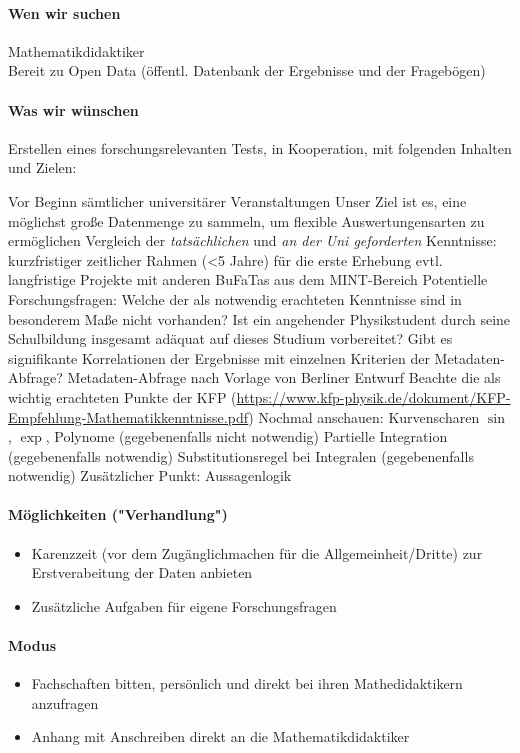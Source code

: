 		\paragraph{Wen wir suchen}
			Mathematikdidaktiker \\
			Bereit zu Open Data (öffentl. Datenbank der Ergebnisse und der Fragebögen)

		\paragraph{Was wir wünschen}
			Erstellen eines forschungsrelevanten Tests, in Kooperation, mit folgenden Inhalten und Zielen:
			\begin{outline}
				\1 Vor Beginn sämtlicher universitärer Veranstaltungen
				\1 Unser Ziel ist es, eine möglichst große Datenmenge zu sammeln, um flexible Auswertungensarten zu ermöglichen
				\1 Vergleich der \textit{tatsächlichen} und \textit{an der Uni geforderten} Kenntnisse:
					\2 kurzfristiger zeitlicher Rahmen (<5 Jahre) für die erste Erhebung
					\2 evtl. langfristige Projekte mit anderen BuFaTas aus dem MINT-Bereich
				\1 Potentielle Forschungsfragen:
					\2 Welche der als notwendig erachteten Kenntnisse sind in besonderem Maße nicht vorhanden?
					\2 Ist ein angehender Physikstudent durch seine Schulbildung insgesamt adäquat auf dieses Studium vorbereitet?
					\2 Gibt es signifikante Korrelationen der Ergebnisse mit einzelnen Kriterien der Metadaten-Abfrage?
				\1 Metadaten-Abfrage nach Vorlage von Berliner Entwurf
				\1 Beachte die als wichtig erachteten Punkte der KFP (\url{https://www.kfp-physik.de/dokument/KFP-Empfehlung-Mathematikkenntnisse.pdf})
				\1 Nochmal anschauen:
					\2 Kurvenscharen $\sin$, $\exp$, Polynome (gegebenenfalls nicht notwendig)
					\2 Partielle Integration (gegebenenfalls notwendig)
					\2 Substitutionsregel bei Integralen (gegebenenfalls notwendig)
				\1 Zusätzlicher Punkt:
					\2 Aussagenlogik
			\end{outline}

		\paragraph{Möglichkeiten ("Verhandlung")}
			\begin{itemize}
				\item Karenzzeit (vor dem Zugänglichmachen für die Allgemeinheit/Dritte) zur Erstverabeitung der Daten anbieten
				\item Zusätzliche Aufgaben für eigene Forschungsfragen
			\end{itemize}

		\paragraph{Modus}
			\begin{itemize}
				\item Fachschaften bitten, persönlich und direkt bei ihren Mathedidaktikern anzufragen
				\item Anhang mit Anschreiben direkt an die Mathematikdidaktiker
			\end{itemize}
